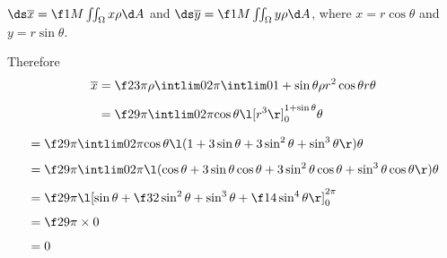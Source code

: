 \documentclass[a4paper]{article}
\begin{document}
\subsection{~}

$\ds \overline x = \f1M \iint_\Omega x \rho \d A$ and $\ds \overline y = \f1M \iint_\Omega y \rho \d A$, where $x = r\cos\theta$ and $y = r\sin\theta$.

Therefore \begin{align*}
\overline x &= \f2{3\pi\rho} \intlim 0{2\pi} {\intlim 0 {1 + \sin \theta} {\rho r^2 \cos \theta} r} \theta\\[1ex]
&= \f2{9\pi} \intlim 0{2\pi} {\cos \theta \l[r^3\r]_0^{1 + \sin\theta}} \theta\\[1ex]
\end{align*}
\begin{align*}
&= \f2{9\pi} \intlim 0{2\pi} {\cos \theta \l( 1 + 3\sin\theta + 3\sin^2 \theta + \sin^3 \theta \r)} \theta\\[1ex]
 &= \f2{9\pi} \intlim 0{2\pi} {\l( \cos\theta + 3\sin\theta \cos\theta + 3\sin^2 \theta \cos\theta + \sin^3 \theta \cos\theta \r)} \theta\\[1ex]
&= \f2{9\pi} \l[ \sin\theta + \f32 \sin^2 \theta + \sin^3 \theta + \f14 \sin^4 \theta\r]_0^{2\pi}\\[1ex]
&= \f2{9\pi} \times 0 \\[1ex]
&= 0
\end{align*}
\end{document}
